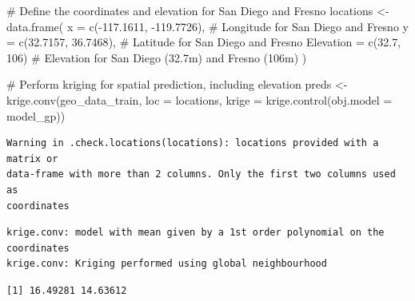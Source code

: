 \documentclass[
  11pt,
]{article}
\newenvironment{Shaded}{\begin{snugshade}}{\end{snugshade}}
\newcommand{\AttributeTok}[1]{\textcolor[rgb]{0.40,0.45,0.13}{#1}}
\newcommand{\CommentTok}[1]{\textcolor[rgb]{0.37,0.37,0.37}{#1}}
\newcommand{\DecValTok}[1]{\textcolor[rgb]{0.68,0.00,0.00}{#1}}
\newcommand{\FloatTok}[1]{\textcolor[rgb]{0.68,0.00,0.00}{#1}}
\newcommand{\FunctionTok}[1]{\textcolor[rgb]{0.28,0.35,0.67}{#1}}
\newcommand{\NormalTok}[1]{\textcolor[rgb]{0.00,0.23,0.31}{#1}}
\newcommand{\OtherTok}[1]{\textcolor[rgb]{0.00,0.23,0.31}{#1}}
\newcommand{\SpecialCharTok}[1]{\textcolor[rgb]{0.37,0.37,0.37}{#1}}
\begin{document}
\begin{Shaded}
\begin{Highlighting}[]
\CommentTok{\# Define the coordinates and elevation for San Diego and Fresno}
\NormalTok{locations }\OtherTok{\textless{}{-}} \FunctionTok{data.frame}\NormalTok{(}
  \AttributeTok{x =} \FunctionTok{c}\NormalTok{(}\SpecialCharTok{{-}}\FloatTok{117.1611}\NormalTok{, }\SpecialCharTok{{-}}\FloatTok{119.7726}\NormalTok{),  }\CommentTok{\# Longitude for San Diego and Fresno}
  \AttributeTok{y =} \FunctionTok{c}\NormalTok{(}\FloatTok{32.7157}\NormalTok{, }\FloatTok{36.7468}\NormalTok{),      }\CommentTok{\# Latitude for San Diego and Fresno}
  \AttributeTok{Elevation =} \FunctionTok{c}\NormalTok{(}\FloatTok{32.7}\NormalTok{, }\DecValTok{106}\NormalTok{)      }\CommentTok{\# Elevation for San Diego (32.7m) and Fresno (106m)}
\NormalTok{)}

\CommentTok{\# Perform kriging for spatial prediction, including elevation}
\NormalTok{preds }\OtherTok{\textless{}{-}} \FunctionTok{krige.conv}\NormalTok{(geo\_data\_train, }\AttributeTok{loc =}\NormalTok{ locations, }\AttributeTok{krige =} \FunctionTok{krige.control}\NormalTok{(}\AttributeTok{obj.model =}\NormalTok{ model\_gp))}
\end{Highlighting}
\end{Shaded}

\begin{verbatim}
Warning in .check.locations(locations): locations provided with a matrix or
data-frame with more than 2 columns. Only the first two columns used as
coordinates
\end{verbatim}

\begin{verbatim}
krige.conv: model with mean given by a 1st order polynomial on the coordinates
krige.conv: Kriging performed using global neighbourhood 
\end{verbatim}

\begin{Shaded}
\end{Shaded}

\begin{verbatim}
[1] 16.49281 14.63612
\end{verbatim}
\end{document}
